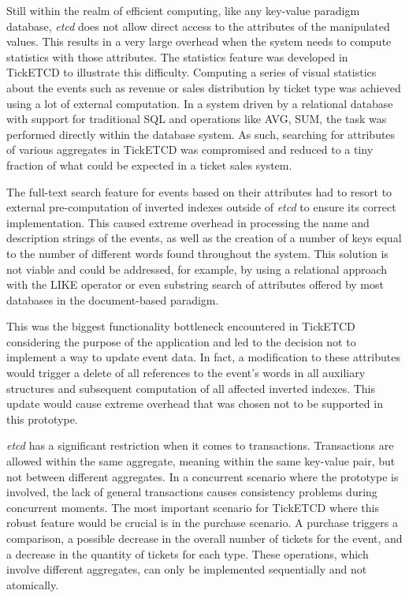 \documentclass[screen,review]{acmart}
\begin{document}
Still within the realm of efficient computing, like any key-value paradigm database, \textit{etcd} does not allow direct access to the attributes of the manipulated values. This results in a very large overhead when the system needs to compute statistics with those attributes. The statistics feature was developed in TickETCD to illustrate this difficulty. Computing a series of visual statistics about the events such as revenue or sales distribution by ticket type was achieved using a lot of external computation. In a system driven by a relational database with support for traditional SQL and operations like AVG, SUM, the task was performed directly within the database system.
As such, searching for attributes of various aggregates in TickETCD was compromised and reduced to a tiny fraction of what could be expected in a ticket sales system.

The full-text search feature for events based on their attributes had to resort to external pre-computation of inverted indexes outside of \textit{etcd} to ensure its correct implementation. This caused extreme overhead in processing the name and description strings of the events, as well as the creation of a number of keys equal to the number of different words found throughout the system. This solution is not viable and could be addressed, for example, by using a relational approach with the LIKE operator or even substring search of attributes offered by most databases in the document-based paradigm.

This was the biggest functionality bottleneck encountered in TickETCD considering the purpose of the application and led to the decision not to implement a way to update event data. In fact, a modification to these attributes would trigger a delete of all references to the event's words in all auxiliary structures and subsequent computation of all affected inverted indexes. This update would cause extreme overhead that was chosen not to be supported in this prototype.

\textit{etcd} has a significant restriction when it comes to transactions. Transactions are allowed within the same aggregate, meaning within the same key-value pair, but not between different aggregates. In a concurrent scenario where the prototype is involved, the lack of general transactions causes consistency problems during concurrent moments. The most important scenario for TickETCD where this robust feature would be crucial is in the purchase scenario. A purchase triggers a comparison, a possible decrease in the overall number of tickets for the event, and a decrease in the quantity of tickets for each type. These operations, which involve different aggregates, can only be implemented sequentially and not atomically.
\end{document}

